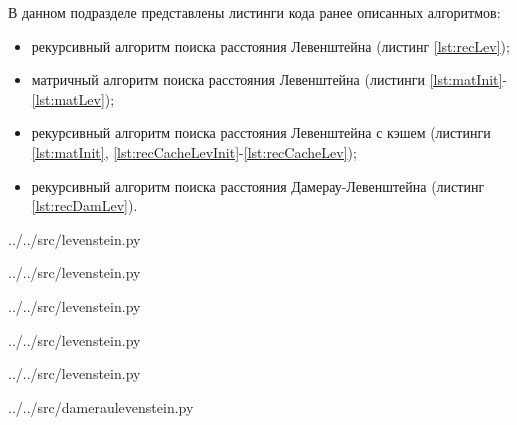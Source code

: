В данном подразделе представлены листинги кода ранее описанных алгоритмов:
\begin{itemize}[left=\parindent]
    \item рекурсивный алгоритм поиска расстояния Левенштейна (листинг
          \ref{lst:recLev});
    \item матричный алгоритм поиска расстояния Левенштейна (листинги
          \ref{lst:matInit}-\ref{lst:matLev});
    \item рекурсивный алгоритм поиска расстояния Левенштейна с кэшем (листинги
          \ref{lst:matInit}, \ref{lst:recCacheLevInit}-\ref{lst:recCacheLev});
    \item рекурсивный алгоритм поиска расстояния Дамерау-Левенштейна (листинг
          \ref{lst:recDamLev}).
\end{itemize}

\begin{lstinputlisting}[
	caption={Реализация рекурсивного алгоритма поиска расстояния Левенштейна},
	label={lst:recLev},
	linerange={20-35}
]{../../src/levenstein.py}
\end{lstinputlisting}

\begin{lstinputlisting}[
	caption={Реализация инициализации матрицы},
	label={lst:matInit},
	linerange={3-7}
]{../../src/levenstein.py}
\end{lstinputlisting}

\begin{lstinputlisting}[
	caption={Реализация матричного алгоритма поиска расстояния Левенштейна},
	label={lst:matLev},
	linerange={38-52}
]{../../src/levenstein.py}
\end{lstinputlisting}

\begin{lstinputlisting}[
    caption={Реализация инициализации данных для рекурсивного алгоритма поиска
             расстояния Левенштейна с кэшем},
	label={lst:recCacheLevInit},
	linerange={77-82}
]{../../src/levenstein.py}
\end{lstinputlisting}

\begin{lstinputlisting}[
	caption={Реализация рекурсивного алгоритма поиска расстояния Левенштейна с кэшем},
	label={lst:recCacheLev},
	linerange={55-74}
]{../../src/levenstein.py}
\end{lstinputlisting}

\begin{lstinputlisting}[
    caption={Реализация рекурсивного алгоритма поиска расстояния
             Дамерау-Левенштейна с кэшем},
	label={lst:recDamLev},
	linerange={3-27}
]{../../src/dameraulevenstein.py}
\end{lstinputlisting}

